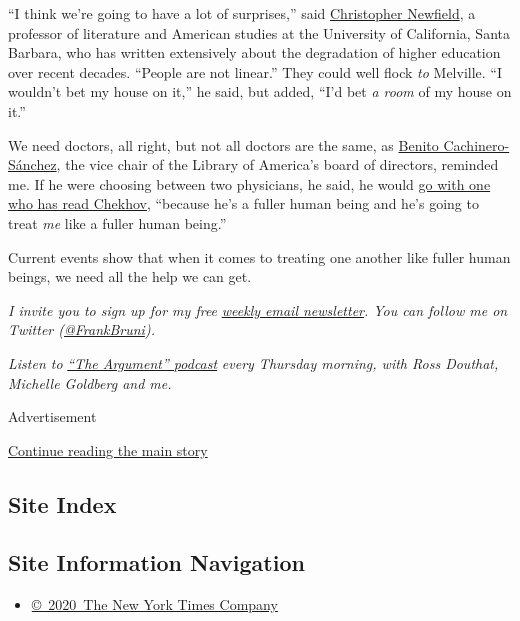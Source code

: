 ``I think we're going to have a lot of surprises,'' said
\href{https://www.english.ucsb.edu/people/newfield-christopher}{Christopher
Newfield}, a professor of literature and American studies at the
University of California, Santa Barbara, who has written extensively
about the degradation of higher education over recent decades. ``People
are not linear.'' They could well flock \emph{to} Melville. ``I wouldn't
bet my house on it,'' he said, but added, ``I'd bet \emph{a room} of my
house on it.''

We need doctors, all right, but not all doctors are the same, as
\href{https://www.egonzehnder.com/office/new-york/consultant/benito-cachinero}{Benito
Cachinero-Sánchez}, the vice chair of the Library of America's board of
directors, reminded me. If he were choosing between two physicians, he
said, he would
\href{https://www.theatlantic.com/health/archive/2018/07/medicine-doctors-fiction/566342/}{go
with one who has read Chekhov}, ``because he's a fuller human being and
he's going to treat \emph{me} like a fuller human being.''

Current events show that when it comes to treating one another like
fuller human beings, we need all the help we can get.

\emph{I invite you to sign up for my free}
\href{https://www.nytimes3xbfgragh.onion/newsletters/frank-bruni}{\emph{weekly
email newsletter}}\emph{. You can follow me on Twitter
(}\href{https://twitter.com/FrankBruni}{\emph{@FrankBruni}}\emph{).}

\emph{Listen to}
\href{https://www.nytimes3xbfgragh.onion/column/the-argument}{\emph{``The
Argument'' podcast}} \emph{every Thursday morning, with Ross Douthat,
Michelle Goldberg and me.}

Advertisement

\protect\hyperlink{after-bottom}{Continue reading the main story}

\hypertarget{site-index}{%
\subsection{Site Index}\label{site-index}}

\hypertarget{site-information-navigation}{%
\subsection{Site Information
Navigation}\label{site-information-navigation}}

\begin{itemize}
\tightlist
\item
  \href{https://help.nytimes3xbfgragh.onion/hc/en-us/articles/115014792127-Copyright-notice}{©~2020~The
  New York Times Company}
\end{itemize}

